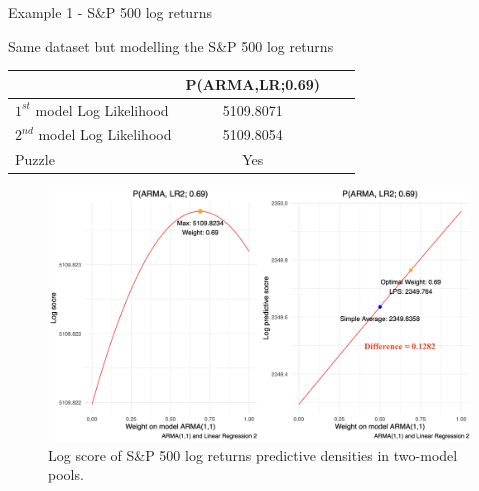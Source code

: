 \begin{frame}{Example 1 - S\&P 500 log returns}

Same dataset but modelling the S\&P 500 log returns

\begin{table}[ht]
  \centering
    \begin{tabular}{l|ccc}
    \toprule
                                      &        P(ARMA,LR;0.69)    \\  
    \midrule
    $1^{st}$ model Log Likelihood     &         5109.8071         \\
    $2^{nd}$ model Log Likelihood     &         5109.8054         \\
    Puzzle                            &           Yes             \\
    \bottomrule
    \end{tabular}
\end{table}
\end{frame}



\begin{frame}[plain]{}
\begin{figure}[ht]
\centering
\includegraphics[scale=0.37]{Graph/SP500_stationary.png}
\caption{\footnotesize Log score of S\&P 500 log returns predictive densities in two-model pools.}
\end{figure}
\end{frame}



